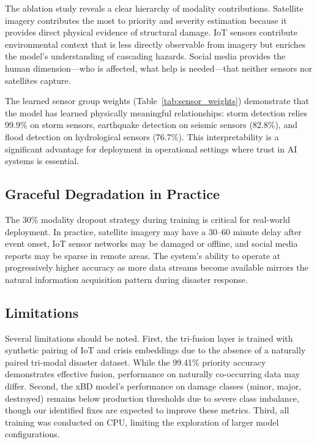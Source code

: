 \documentclass[journal]{IEEEtran}
\begin{document}
The ablation study reveals a clear hierarchy of modality contributions. Satellite imagery contributes the most to priority and severity estimation because it provides direct physical evidence of structural damage. IoT sensors contribute environmental context that is less directly observable from imagery but enriches the model's understanding of cascading hazards. Social media provides the human dimension---who is affected, what help is needed---that neither sensors nor satellites capture.

The learned sensor group weights (Table~\ref{tab:sensor_weights}) demonstrate that the model has learned physically meaningful relationships: storm detection relies 99.9\% on storm sensors, earthquake detection on seismic sensors (82.8\%), and flood detection on hydrological sensors (76.7\%). This interpretability is a significant advantage for deployment in operational settings where trust in AI systems is essential.

\subsection{Graceful Degradation in Practice}

The 30\% modality dropout strategy during training is critical for real-world deployment. In practice, satellite imagery may have a 30--60 minute delay after event onset, IoT sensor networks may be damaged or offline, and social media reports may be sparse in remote areas. The system's ability to operate at progressively higher accuracy as more data streams become available mirrors the natural information acquisition pattern during disaster response.

\subsection{Limitations}

Several limitations should be noted. First, the tri-fusion layer is trained with synthetic pairing of IoT and crisis embeddings due to the absence of a naturally paired tri-modal disaster dataset. While the 99.41\% priority accuracy demonstrates effective fusion, performance on naturally co-occurring data may differ. Second, the xBD model's performance on damage classes (minor, major, destroyed) remains below production thresholds due to severe class imbalance, though our identified fixes are expected to improve these metrics. Third, all training was conducted on CPU, limiting the exploration of larger model configurations.
\end{document}
